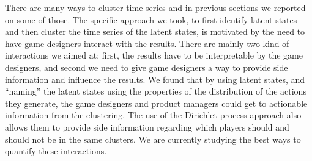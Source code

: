 
There are many ways to cluster time series and in previous sections we reported on some of those. The specific approach we took, to first identify latent states and then cluster the time series of the latent states, is motivated by the need to have game designers interact with the results.  There are mainly two kind of interactions we aimed at: first, the results have to be interpretable by the game designers, and second we need to give game designers a way to provide side information and influence the results.  We found that by using latent states, and ``naming'' the latent states using the properties of the distribution of the actions they generate, the game designers and product managers could get to actionable information from the clustering.  The use of the Dirichlet process approach also allows them to provide side information regarding which players should and should not be in the same clusters.  We are currently studying the best ways to quantify these interactions. 

